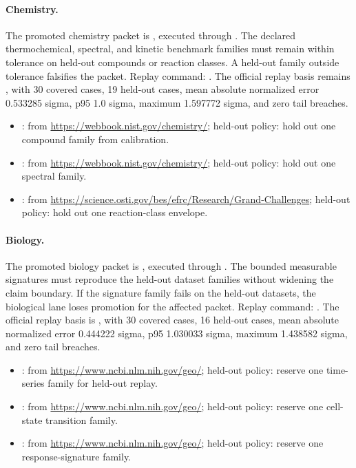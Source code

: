 \paragraph{Chemistry.}
The promoted chemistry packet is
, executed through
. The
declared thermochemical, spectral, and kinetic benchmark families must remain
within tolerance on held-out compounds or reaction classes. A held-out family
outside tolerance falsifies the packet. Replay command:
.
The official replay basis remains
, with 30 covered cases, 19 held-out
cases, mean absolute normalized error 0.533285 sigma, p95 1.0 sigma, maximum
1.597772 sigma, and zero tail breaches.
\begin{itemize}[leftmargin=1.5em,nosep]
\item {}:  from \url{https://webbook.nist.gov/chemistry/}; held-out policy: hold out one compound family from calibration.
\item {}:  from \url{https://webbook.nist.gov/chemistry/}; held-out policy: hold out one spectral family.
\item {}:  from \url{https://science.osti.gov/bes/efrc/Research/Grand-Challenges}; held-out policy: hold out one reaction-class envelope.
\end{itemize}

\paragraph{Biology.}
The promoted biology packet is
, executed
through
.
The bounded measurable signatures must reproduce the held-out dataset families
without widening the claim boundary. If the signature family fails on the
held-out datasets, the biological lane loses promotion for the affected packet.
Replay command:
.
The official replay basis is , with 30
covered cases, 16 held-out cases, mean absolute normalized error 0.444222
sigma, p95 1.030033 sigma, maximum 1.438582 sigma, and zero tail breaches.
\begin{itemize}[leftmargin=1.5em,nosep]
\item {}:  from \url{https://www.ncbi.nlm.nih.gov/geo/}; held-out policy: reserve one time-series family for held-out replay.
\item {}:  from \url{https://www.ncbi.nlm.nih.gov/geo/}; held-out policy: reserve one cell-state transition family.
\item {}:  from \url{https://www.ncbi.nlm.nih.gov/geo/}; held-out policy: reserve one response-signature family.
\end{itemize}


